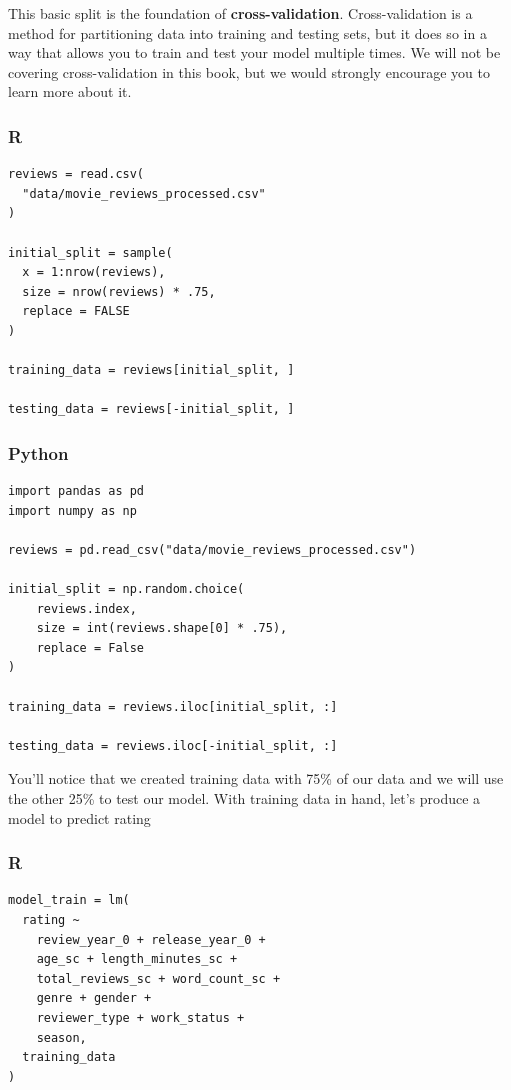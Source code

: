 \documentclass[
  letterpaper,
]{krantz}
\begin{document}
This basic split is the foundation of \textbf{cross-validation}.
Cross-validation is a method for partitioning data into training and
testing sets, but it does so in a way that allows you to train and test
your model multiple times. We will not be covering cross-validation in
this book, but we would strongly encourage you to learn more about it.

\subsubsection{R}

\begin{verbatim}
reviews = read.csv(
  "data/movie_reviews_processed.csv"
)

initial_split = sample(
  x = 1:nrow(reviews), 
  size = nrow(reviews) * .75, 
  replace = FALSE
)

training_data = reviews[initial_split, ]

testing_data = reviews[-initial_split, ]
\end{verbatim}

\subsubsection{Python}

\begin{verbatim}
import pandas as pd
import numpy as np

reviews = pd.read_csv("data/movie_reviews_processed.csv")

initial_split = np.random.choice(
    reviews.index, 
    size = int(reviews.shape[0] * .75), 
    replace = False
)

training_data = reviews.iloc[initial_split, :]

testing_data = reviews.iloc[-initial_split, :]
\end{verbatim}

You'll notice that we created training data with 75\% of our data and we
will use the other 25\% to test our model. With training data in hand,
let's produce a model to predict rating

\subsubsection{R}

\begin{verbatim}
model_train = lm(
  rating ~ 
    review_year_0 + release_year_0 + 
    age_sc + length_minutes_sc + 
    total_reviews_sc + word_count_sc +
    genre + gender +
    reviewer_type + work_status +
    season, 
  training_data
)
\end{verbatim}
\end{document}

